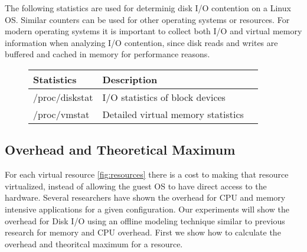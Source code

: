 The following statistics are used for determinig disk I/O contention on a Linux OS.  Similar counters can be used for other operating systems or resources. For modern operating systems it is important to collect both I/O and virtual memory information when analyzing I/O contention, since disk reads and writes are buffered and cached in memory for performance reasons.  
\begin{figure}
\begin{tabular}{ l l p{5cm} }
  Statistics & Description \\
  \hline
  /proc/diskstat & I/O statistics of block devices \\
  /proc/vmstat & Detailed virtual memory statistics\\
\end{tabular}
\label{fig:iocounters}
\end{figure}


\subsection{Overhead and Theoretical Maximum}
For each virtual resource \ref{fig:resources} there is a cost to making that resource virtualized, instead of allowing the guest OS to have direct access to the hardware.  Several researchers \cite{cherkasova, huber1} have shown the overhead for CPU and memory intensive applications for a given configuration.  Our experiments will show the overhead for Disk I/O using an offline modeling technique similar to previous research for memory and CPU overhead.  First we show how to calculate the overhead and theoritcal maximum for a resource.

